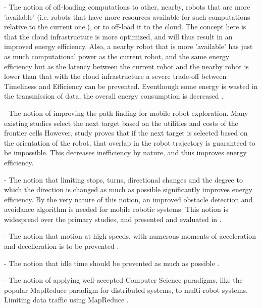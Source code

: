 - The notion of off-loading computations to other, nearby, robots that are more 'available' 
(i.e. robots that have more resources available for such computations relative to the current one.), or to off-load it to the cloud.
The concept here is that the cloud infrastructure is more optimized, and will thus result in an improved energy efficiency. 
Also, a nearby robot that is more 'available' has just as much computational power as the current robot, and the same energy efficiency
but as the latency between the current robot and the nearby robot is lower than that with the cloud infrastructure a severe trade-off between
Timeliness and Efficiency can be prevented.
Eventhough some energy is wasted in the transmission of data, the overall energy consumption is decreased \cite{rahman2019cloud_robot_offloading}.
    
- The notion of improving the path finding for mobile robot exploration. 
Many existing studies select the next target based on the utilities and costs of the frontier cells 
\cite{burgard2005multi_robot_exploration, simmons2000multi_robot_exploration,zlot2002multi_robot_exploration} 
However, study \cite{mei2006mobile_exploration} proves that if the next target is selected based on the orientation of the robot, 
that overlap in the robot trajectory is guaranteed to be impossible. This decreases inefficiency by nature, and thus improves energy 
efficiency.

- The notion that limiting stops, turns, directional changes and the degree to which the direction is changed as much as possible 
significantly improves energy efficiency. By the very nature of this notion, an improved obstacle detection and avoidance algorithm
is needed for mobile robotic systems. This notion is widespread over the primary studies, and presented and evaluated in 
\cite{xie2018mecanum_wheel, kim2016firefighting_robot, benkrid2016multi_robot_exploration, barili1995efficient_motion, 
jia2004grid_strategy_exploration, mei2005energy_consumers_identified, patel2012exploration_strategy}.

- The notion that motion at high speeds, with numerous moments of acceleration and decelleration is to be prevented
\cite{wingstrom2013robot_cell_scheduling}.

- The notion that idle time should be prevented as much as possible \cite{gurel2019industrial_robot_scheduling, 
kaitwanidvilai2020industrial_robot_cycle_time, wingstrom2013robot_cell_scheduling}.

- The notion of applying well-accepted Computer Science paradigms, like the popular MapReduce paradigm for distributed systems,
to multi-robot systems. Limiting data traffic using MapReduce \cite{huh2013distributed_swarm}.


